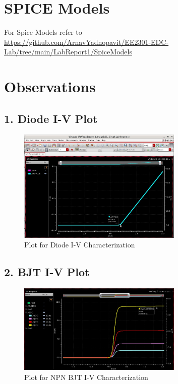 \documentclass[12pt,a4paper]{article}
\begin{document}
\section*{SPICE Models}
For Spice Models refer to\\
\url{https://github.com/ArnavYadnopavit/EE2301-EDC-Lab/tree/main/LabReport1/SpiceModels}

\section*{Observations}
\subsection*{1. Diode I-V Plot}
\begin{figure}[H]
    \centering
    \includegraphics[width=0.7\textwidth]{figs/Diode/Plot.jpg} %
    \caption{Plot for Diode I-V Characterization}
\end{figure}

\subsection*{2. BJT I-V Plot}
\begin{figure}[H]
    \centering
    \includegraphics[width=0.7\textwidth]{figs/BJT/NPN/Plot.jpg} %
    \caption{Plot for NPN BJT I-V Characterization}
\end{figure}
\end{document}
